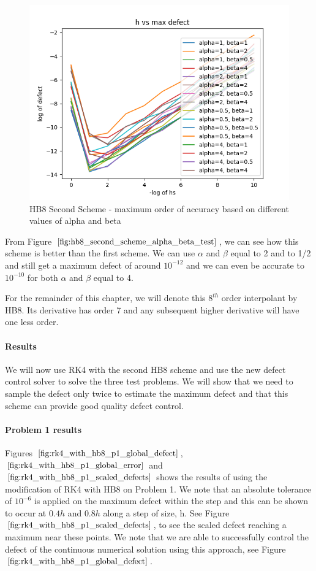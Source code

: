 \documentclass{article}
\begin{document}
\begin{figure}[H]
\centering
\includegraphics[width=0.7\linewidth]{./figures/hb8_second_scheme_alpha_beta_test}
\caption{HB8 Second Scheme - maximum order of accuracy based on different values of alpha and beta}
\label{fig:hb8_second_scheme_alpha_beta_test}
\end{figure}

From Figure $\ref{fig:hb8_second_scheme_alpha_beta_test}$, we can see how this scheme is better than the first scheme. We can use $\alpha$ and $\beta$ equal to 2 and to 1/2 and still get a maximum defect of around $10^{-12}$ and we can even be accurate to $10^{-10}$ for both $\alpha$ and $\beta$ equal to 4. 

For the remainder of this chapter, we will denote this $8^{th}$ order interpolant by HB8. Its derivative has order 7 and any subsequent higher derivative will have one less order.

\paragraph{Results}
We will now use RK4 with the second HB8 scheme and use the new defect control solver to solve the three test problems. We will show that we need to sample the defect only twice to estimate the maximum defect and that this scheme can provide good quality defect control.

\paragraph{Problem 1 results}
Figures $\ref{fig:rk4_with_hb8_p1_global_defect}$, $\ref{fig:rk4_with_hb8_p1_global_error}$ and $\ref{fig:rk4_with_hb8_p1_scaled_defects}$ shows the results of using the modification of RK4 with HB8 on Problem 1. We note that an absolute tolerance of $10^{-6}$ is applied on the maximum defect within the step and this can be shown to occur at $0.4h$ and $0.8h$ along a step of size, h. See Figure $\ref{fig:rk4_with_hb8_p1_scaled_defects}$, to see the scaled defect reaching a maximum near these points. We note that we are able to successfully control the defect of the continuous numerical solution using this approach, see Figure $\ref{fig:rk4_with_hb8_p1_global_defect}$. 
\end{document}
